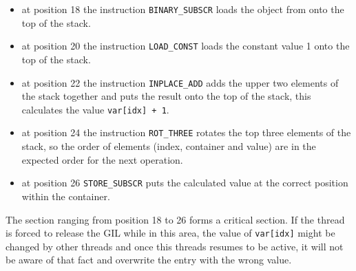 \documentclass[english,11pt,a4paper,table]{article} %
\begin{document}
\begin{itemize}
	\item at position 18 the instruction \texttt{BINARY\_SUBSCR} loads the object from  onto the top of the stack.
	\item at position 20 the instruction \texttt{LOAD\_CONST} loads the constant value 1 onto the top of the stack.
	\item at position 22 the instruction \texttt{INPLACE\_ADD} adds the upper two elements of the stack together and puts the result onto the top of the stack, this calculates the value \texttt{var[idx] + 1}.
	\item at position 24 the instruction \texttt{ROT\_THREE} rotates the top three elements of the stack, so the order of elements (index, container and value) are in the expected order for the next operation.
	\item at position 26 \texttt{STORE\_SUBSCR} puts the calculated value at the correct position within the container.
\end{itemize}

The section ranging from position 18 to 26 forms a critical section.
If the thread is forced to release the GIL while in this area,
the value of \texttt{var[idx]} might be changed by other threads and once this threads resumes to be active, it will not be aware of that fact and overwrite the entry with the wrong value. \cite{ceval,ceval_gil,Understanding_the_Python_GIL}
\end{document}
